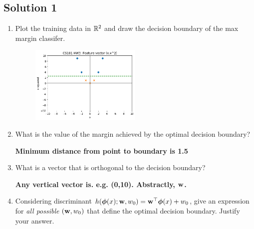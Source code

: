 \documentclass[submit]{harvardml}
\newenvironment{answer}{%
    \color{answergreen}\bf}
  {%
  }
\begin{document}
\subsection*{Solution 1}
    \begin{enumerate}
        \item Plot the training data in $\mathbb{R}^2$ and draw the decision boundary of the max margin classifer.

            \begin{figure}[H]
                \centering
                \includegraphics[width=0.5\textwidth]{problem1.png}
                \caption{}
                \label{Problem 1, part 1.}
            \end{figure}

        
        \item  What is the value of the margin achieved by the optimal decision boundary? 

\begin{answer}
            Minimum distance from point to boundary is 1.5 %
\end{answer}
            
        \item What is a vector that is orthogonal to the decision boundary?

            \begin{answer}
                Any vertical vector is. e.g. (0,10). Abstractly, $\mathbf{w}$.
            \end{answer}

        \item Considering discriminant $h(\boldsymbol{\phi}(x);\mathbf{w},w_0)=\mathbf{w}^\top\boldsymbol{\phi}(x) +w_0$, give an
            expression for {\em all possible} $(\mathbf{w},w_0)$ that define the optimal decision boundary.
            Justify your answer.

            \begin{answer}
 

\end{answer}
\end{enumerate}
\end{document}
